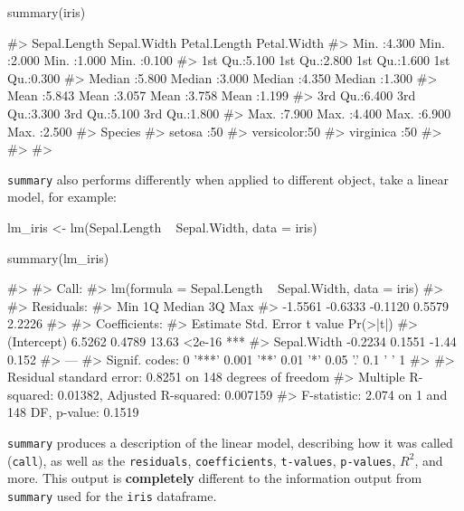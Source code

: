 \begin{Schunk}
\begin{Sinput}
summary(iris)
\end{Sinput}
\begin{Soutput}
#>   Sepal.Length    Sepal.Width     Petal.Length    Petal.Width   
#>  Min.   :4.300   Min.   :2.000   Min.   :1.000   Min.   :0.100  
#>  1st Qu.:5.100   1st Qu.:2.800   1st Qu.:1.600   1st Qu.:0.300  
#>  Median :5.800   Median :3.000   Median :4.350   Median :1.300  
#>  Mean   :5.843   Mean   :3.057   Mean   :3.758   Mean   :1.199  
#>  3rd Qu.:6.400   3rd Qu.:3.300   3rd Qu.:5.100   3rd Qu.:1.800  
#>  Max.   :7.900   Max.   :4.400   Max.   :6.900   Max.   :2.500  
#>        Species  
#>  setosa    :50  
#>  versicolor:50  
#>  virginica :50  
#>                 
#>                 
#> 
\end{Soutput}
\end{Schunk}

\texttt{summary} also performs differently when applied to different
object, take a linear model, for example:

\begin{Schunk}
\begin{Sinput}
lm_iris <- lm(Sepal.Length ~ Sepal.Width, data = iris)

summary(lm_iris)
\end{Sinput}
\begin{Soutput}
#> 
#> Call:
#> lm(formula = Sepal.Length ~ Sepal.Width, data = iris)
#> 
#> Residuals:
#>     Min      1Q  Median      3Q     Max 
#> -1.5561 -0.6333 -0.1120  0.5579  2.2226 
#> 
#> Coefficients:
#>             Estimate Std. Error t value Pr(>|t|)    
#> (Intercept)   6.5262     0.4789   13.63   <2e-16 ***
#> Sepal.Width  -0.2234     0.1551   -1.44    0.152    
#> ---
#> Signif. codes:  0 '***' 0.001 '**' 0.01 '*' 0.05 '.' 0.1 ' ' 1
#> 
#> Residual standard error: 0.8251 on 148 degrees of freedom
#> Multiple R-squared:  0.01382,    Adjusted R-squared:  0.007159 
#> F-statistic: 2.074 on 1 and 148 DF,  p-value: 0.1519
\end{Soutput}
\end{Schunk}

\texttt{summary} produces a description of the linear model, describing
how it was called (\texttt{call}), as well as the \texttt{residuals},
\texttt{coefficients}, \texttt{t-values}, \texttt{p-values}, \(R^2\),
and more. This output is \textbf{completely} different to the
information output from \texttt{summary} used for the \texttt{iris}
dataframe.

